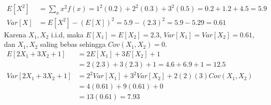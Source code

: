 \documentclass[11pt,letterpaper]{article}
\begin{document}
\begin{enumerate}
\begin{enumerate}[label=\alph*)]
\begin{align*}
                  E[X^2] & = \sum_{x} x^2 f(x) = 1^2(0.2) + 2^2(0.3) + 3^2(0.5) = 0.2 + 1.2 + 4.5 = 5.9 \\
                  Var[X] & = E[X^2] - (E[X])^2 = 5.9 - (2.3)^2 = 5.9 - 5.29 = 0.61
                \end{align*}
                Karena $X_1, X_2$ i.i.d, maka $E[X_1] = E[X_2] = 2.3$, $Var[X_1] = Var[X_2] = 0.61$, dan $X_1, X_2$ saling bebas sehingga $Cov(X_1, X_2) = 0$.
                \begin{align*}
                  E[2X_1 + 3X_2 + 1]   & = 2E[X_1] + 3E[X_2] + 1                              \\
                                       & = 2(2.3) + 3(2.3) + 1 = 4.6 + 6.9 + 1 = 12.5         \\
                  Var[2X_1 + 3X_2 + 1] & = 2^2 Var[X_1] + 3^2 Var[X_2] + 2(2)(3)Cov(X_1, X_2) \\
                                       & = 4(0.61) + 9(0.61) + 0                              \\
                                       & = 13(0.61) = 7.93
                \end{align*}
        \end{enumerate}


\end{enumerate}
\end{document}
